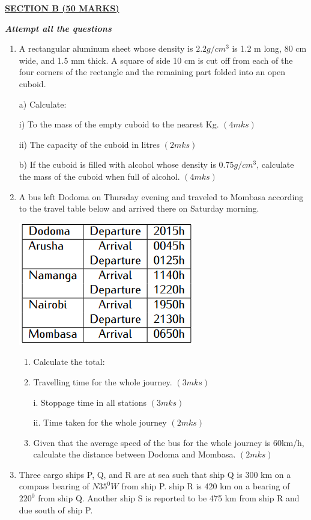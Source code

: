 \documentclass[
  a4paperpaper,
]{scrbook}
\begin{document}
\begin{tcolorbox}
\ul{\textbf{SECTION B (50 MARKS)}}

\textbf{\emph{Attempt all the questions}}

\begin{enumerate}
\def\labelenumi{\arabic{enumi}.}
\setcounter{enumi}{16}
\item
  A rectangular aluminum sheet whose density is \(2.2 g/cm^3\) is 1.2 m
  long, 80 cm wide, and 1.5 mm thick. A square of side 10 cm is cut off
  from each of the four corners of the rectangle and the remaining part
  folded into an open cuboid.

  a) Calculate:

  i) To the mass of the empty cuboid to the nearest Kg. \((4mks)\)

  ii) The capacity of the cuboid in litres \((2mks)\)

  b) If the cuboid is filled with alcohol whose density is
  \(0.75 g/cm^3\), calculate the mass of the cuboid when full of
  alcohol. \((4mks)\)
\item
  A bus left Dodoma on Thursday evening and traveled to Mombasa
  according to the travel table below and arrived there on Saturday
  morning.

  \includegraphics{figures/Md3_Q18.png}

  \begin{enumerate}
  \def\labelenumii{\alph{enumii})}
  \item
    Calculate the total:
  \item
    Travelling time for the whole journey. \((3mks)\)

    i. Stoppage time in all stations \((3mks)\)

    ii. Time taken for the whole journey \((2mks)\)
  \item
    Given that the average speed of the bus for the whole journey is
    60km/h, calculate the distance between Dodoma and Mombasa.
    \((2mks)\)
  \end{enumerate}
\item
  Three cargo ships P, Q, and R are at sea such that ship Q is 300 km on
  a compass bearing of \(N35^0W\) from ship P. ship R is 420 km on a
  bearing of \(220^0\) from ship Q. Another ship S is reported to be 475
  km from ship R and due south of ship P.


\end{enumerate}
\end{tcolorbox}
\end{document}
